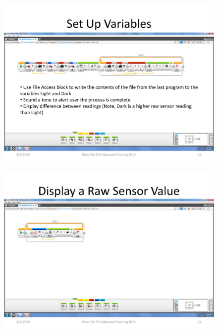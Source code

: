 \documentclass[11pt]{beamer}
\begin{document}
\begin{frame}
\begin{figure}
\includegraphics[scale=0.4]{ev3advanced2015/file-page21}
\end{figure}
\end{frame}

\begin{frame}
\begin{figure}
\includegraphics[scale=0.4]{ev3advanced2015/file-page22}
\end{figure}
\end{frame}
\end{document}
